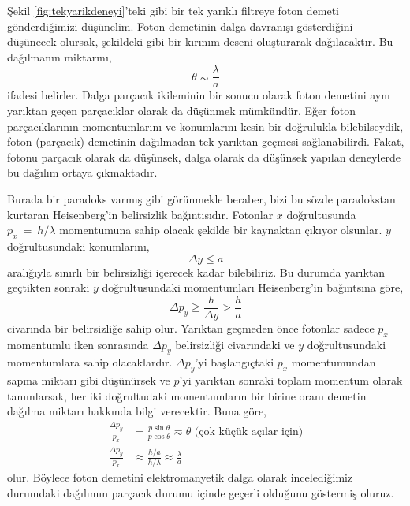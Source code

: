 \documentclass[a4paper,12pt, twoside]{article}
\begin{document}
Şekil \ref{fig:tekyarikdeneyi}'teki gibi bir tek yarıklı filtreye foton demeti gönderdiğimizi düşünelim. Foton demetinin dalga davranışı gösterdiğini düşünecek olursak, şekildeki gibi bir kırınım deseni oluşturarak dağılacaktır. Bu dağılmanın miktarını,
\begin{equation*}
\theta \eqsim \frac{\lambda}{a}
\end{equation*}
ifadesi belirler. Dalga parçacık ikileminin bir sonucu olarak foton demetini aynı yarıktan geçen parçacıklar olarak da düşünmek mümkündür. Eğer foton parçacıklarının momentumlarını ve konumlarını kesin bir doğrulukla bilebilseydik, foton (parçacık) demetinin dağılmadan tek yarıktan geçmesi sağlanabilirdi. Fakat, fotonu parçacık olarak da düşünsek, dalga olarak da düşünsek yapılan deneylerde bu dağılım ortaya çıkmaktadır. 

Burada bir paradoks varmış gibi görünmekle beraber, bizi bu sözde paradokstan kurtaran Heisenberg'in belirsizlik bağıntısıdır. Fotonlar $x$ doğrultusunda $p_x~=~h/\lambda$ momentumuna sahip olacak şekilde bir kaynaktan çıkıyor olsunlar. $y$ doğrultusundaki konumlarını,
\begin{equation*}
\Delta y \leq a
\end{equation*}
aralığıyla sınırlı bir belirsizliği içerecek kadar bilebiliriz. Bu durumda yarıktan geçtikten sonraki $y$ doğrultusundaki momentumları Heisenberg'in bağıntsına göre,
\begin{equation*}
\Delta p_y \geq \frac{h}{\Delta y}>\frac{h}{a}
\end{equation*}
civarında bir belirsizliğe sahip olur. Yarıktan geçmeden önce fotonlar sadece $p_x$ momentumlu iken sonrasında $\Delta p_y$ belirsizliği civarındaki ve $y$ doğrultusundaki momentumlara sahip olacaklardır.
$\Delta p_y$'yi başlangıçtaki $p_x$ momentumundan sapma miktarı gibi düşünürsek ve $p$'yi yarıktan sonraki toplam momentum olarak tanımlarsak, her iki doğrultudaki momentumların bir birine oranı demetin dağılma miktarı hakkında bilgi verecektir. Buna göre,
\begin{align}
\frac{\Delta p_y}{p_x} &= \frac{p \sin\theta}{p \cos\theta}\eqsim\theta \text{ (çok küçük açılar için)}\\
\frac{\Delta p_y}{p_x} &\approx \frac { h / a } { h / \lambda } \approx \frac { \lambda } { a }
\end{align}
olur. Böylece foton demetini elektromanyetik dalga olarak incelediğimiz durumdaki dağılımın parçacık durumu içinde geçerli olduğunu göstermiş oluruz.
\end{document}
